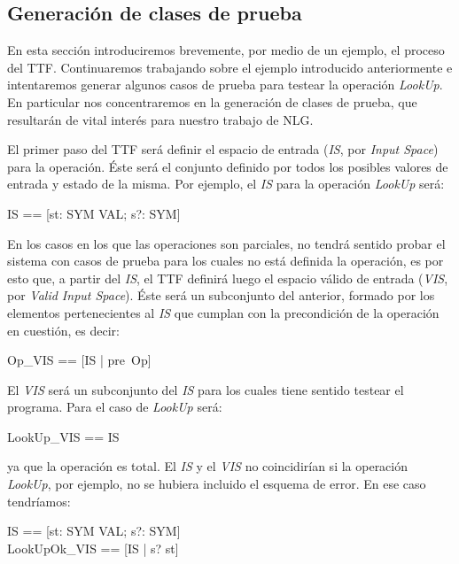 \subsection{Generación de clases de prueba}
\label{sec:tacticas-testing}

En esta sección introduciremos brevemente, por medio de un ejemplo, el proceso del TTF. Continuaremos trabajando sobre el ejemplo introducido anteriormente e intentaremos generar algunos casos de prueba para testear la operación \emph{LookUp}. En particular nos concentraremos en la generación de clases de prueba, que resultarán de vital interés para nuestro trabajo de NLG.

El primer paso del TTF será definir el espacio de entrada (\emph{IS}, por \emph{Input Space}) para la operación. Éste será el conjunto definido por todos los posibles valores de entrada y estado de la misma. Por ejemplo, el \emph{IS} para la operación \emph{LookUp} será:

\begin{zed}
  IS == [st: SYM \pfun VAL; s?: SYM]
\end{zed}

En los casos en los que las operaciones son parciales, no tendrá sentido probar el sistema con casos de prueba para los cuales no está definida la operación, es por esto que, a partir del \emph{IS}, el TTF definirá luego el espacio válido de entrada (\emph{VIS}, por \emph{Valid Input Space}). Éste será un subconjunto del anterior, formado por los elementos pertenecientes al \emph{IS} que cumplan con la precondición de la operación en cuestión, es decir:

\begin{zed}
  Op\_VIS == [IS | pre~Op]
\end{zed}

El \emph{VIS} será un subconjunto del \emph{IS} para los cuales tiene sentido testear el programa. Para el caso de \emph{LookUp} será:

\begin{zed}
  LookUp\_VIS == IS
\end{zed}

\noindent
ya que la operación es total. El \emph{IS} y el \emph{VIS} no coincidirían si la operación \emph{LookUp}, por ejemplo, no se hubiera incluido el esquema de error. En ese caso tendríamos:

\begin{zed}
  IS == [st: SYM \pfun VAL; s?: SYM] \\
  LookUpOk\_VIS == [IS | s? \in \dom st]
\end{zed}

